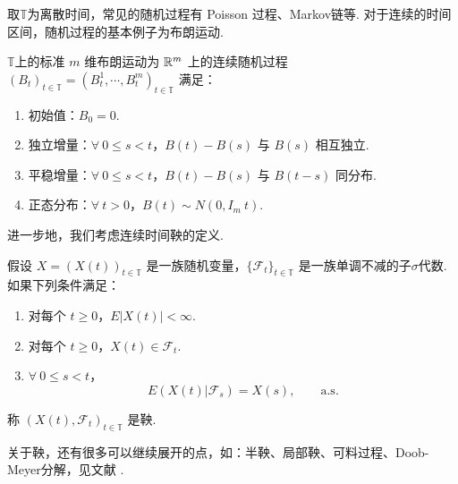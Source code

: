 取$\mathbb T$为离散时间，常见的随机过程有 Poisson 过程、Markov链等. 对于连续的时间区间，随机过程的基本例子为布朗运动. 
\begin{definition}
	$\mathbb T$上的标准 $m$ 维布朗运动为 $\mathbb{R}^m$ 上的连续随机过程 $(B_t)_{t\in \mathbb T} = (B_t^1,\cdots,B_t^m)_{t\in \mathbb T}$ 满足：
	\begin{enumerate}
		\item 初始值：$B_0=0$.
		\item 独立增量：$\forall ~0\le s < t$，$B(t)-B(s)$ 与 $B(s)$ 相互独立. 
		\item 平稳增量：$\forall ~0\le s < t$，$B(t)-B(s)$ 与 $B(t-s)$ 同分布. 
		\item 正态分布：$\forall ~t>0$，$B(t) \sim N(0,I_m~t)$.
	\end{enumerate}
\end{definition}

进一步地，我们考虑连续时间鞅的定义.

\begin{definition}[鞅，Martingale]
	假设 $X=(X(t))_{t\in \mathbb T}$ 是一族随机变量，$\{\mathcal F_t\}_{t\in \mathbb T}$ 是一族单调不减的子$\sigma$代数. 如果下列条件满足：
	\begin{enumerate}
		\item 对每个 $t\ge0$，$E|X(t)|<\infty$.
		\item 对每个 $t\ge0$，$X(t) \in \mathcal F_t$.
		\item $\forall ~0\le s < t$，
		\[
			E(X(t) | \mathcal F_s) =X(s),\qquad \mathrm{a.s.}		
		\]
	\end{enumerate}
	称 $(X(t) , \mathcal F_t)_{t\in \mathbb T}$ 是鞅. 
\end{definition}

关于鞅，还有很多可以继续展开的点，如：半鞅、局部鞅、可料过程、Doob-Meyer分解，见文献 \cite{book1}.



